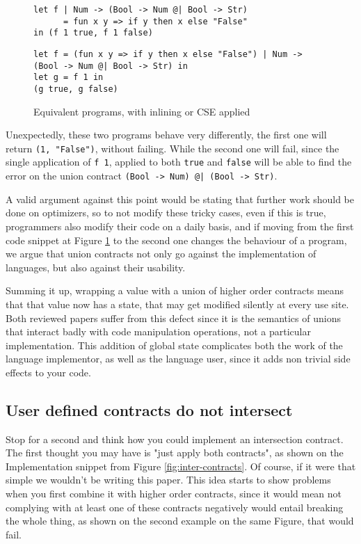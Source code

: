 \documentclass[sigplan,10pt,review,anonymous]{acmart}
\newcommand{\nickel}[1]{\lstinline[language=nickel]{#1}}
\begin{document}
\begin{figure}[h]
\begin{lstlisting}[language=nickel, title=Inlined]
let f | Num -> (Bool -> Num @| Bool -> Str)
      = fun x y => if y then x else "False"
in (f 1 true, f 1 false)
\end{lstlisting}
\begin{lstlisting}[language=nickel, title=Common Subexpression Eliminated]
let f = (fun x y => if y then x else "False") | Num -> (Bool -> Num @| Bool -> Str) in
let g = f 1 in
(g true, g false)
\end{lstlisting}
\caption{Equivalent programs, with inlining or CSE applied}
\label{fig:optimized-programs}
\end{figure}

Unexpectedly, these two programs behave very differently, the first one will
return \nickel{(1, "False")}, without failing.  While the second one will fail,
since the single application of \nickel{f 1}, applied to both \nickel{true} and
\nickel{false} will be able to find the error on the union contract
\nickel{(Bool -> Num) @| (Bool -> Str)}.

A valid argument against this point would be stating that further work should be done
on optimizers, so to not modify these tricky cases, even if this is true,
programmers also modify their code on a daily basis, and if moving from the first
code snippet at Figure \ref{fig:optimized-programs} to the second one changes
the behaviour of a program, we argue that union contracts not only go against the
implementation of languages, but also against their usability.

Summing it up, wrapping a value with a union of higher order contracts means that
that value now has a state, that may get modified silently at every use site.
Both reviewed papers suffer from this defect since it is the semantics
of unions that interact badly with code manipulation operations,
not a particular implementation.
This addition of global state complicates both the work of the language
implementor, as well as the language user, since it adds non trivial
side effects to your code.


\subsection*{User defined contracts do not intersect}
\label{sec:flat-and-inter}

Stop for a second and think how you could implement an intersection
contract. The first thought you may have is "just apply
both contracts", as shown on the Implementation snippet
from Figure \ref{fig:inter-contracts}.
Of course, if it were that simple we wouldn't be writing this paper.
This idea starts to show problems when you first combine it with
higher order contracts, since it would mean not complying with
at least one of these contracts negatively would entail breaking the
whole thing, as shown on the second example on the same Figure,
that would fail.
\end{document}
